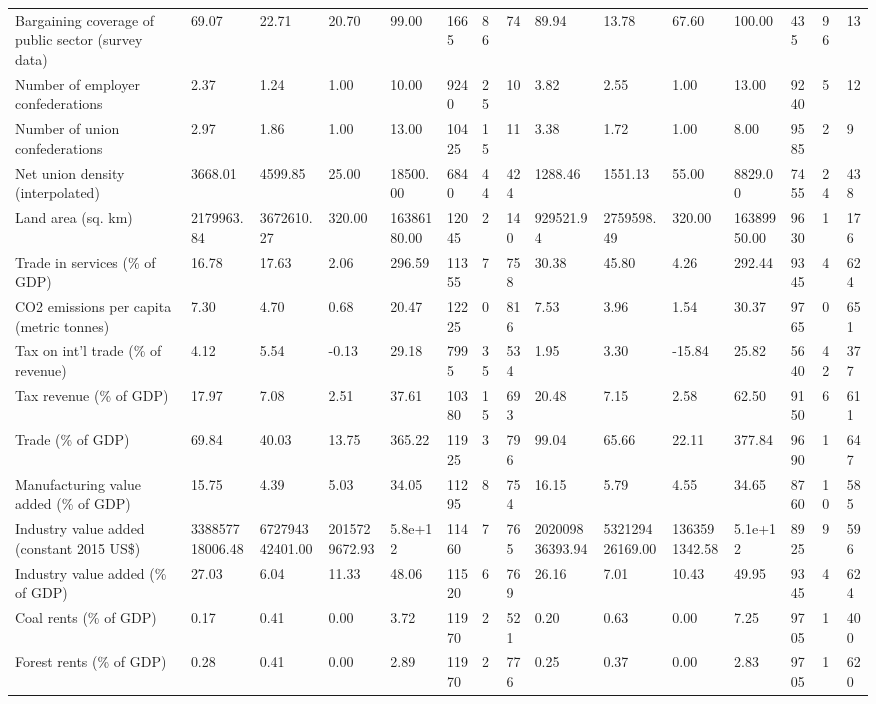 \begin{longtable}{lllllllllllllll}
\addlinespace
Bargaining coverage of public sector (survey data) & 69.07 & 22.71 & 20.70 & 99.00 & 1665 & 86 & 74 & 89.94 & 13.78 & 67.60 & 100.00 & 435 & 96 & 13\\
Number of employer confederations & 2.37 & 1.24 & 1.00 & 10.00 & 9240 & 25 & 10 & 3.82 & 2.55 & 1.00 & 13.00 & 9240 & 5 & 12\\
Number of union confederations & 2.97 & 1.86 & 1.00 & 13.00 & 10425 & 15 & 11 & 3.38 & 1.72 & 1.00 & 8.00 & 9585 & 2 & 9\\
Net union density (interpolated) & 3668.01 & 4599.85 & 25.00 & 18500.00 & 6840 & 44 & 424 & 1288.46 & 1551.13 & 55.00 & 8829.00 & 7455 & 24 & 438\\
Land area (sq. km) & 2179963.84 & 3672610.27 & 320.00 & 16386180.00 & 12045 & 2 & 140 & 929521.94 & 2759598.49 & 320.00 & 16389950.00 & 9630 & 1 & 176\\
\addlinespace
Trade in services (\% of GDP) & 16.78 & 17.63 & 2.06 & 296.59 & 11355 & 7 & 758 & 30.38 & 45.80 & 4.26 & 292.44 & 9345 & 4 & 624\\
CO2 emissions per capita (metric tonnes) & 7.30 & 4.70 & 0.68 & 20.47 & 12225 & 0 & 816 & 7.53 & 3.96 & 1.54 & 30.37 & 9765 & 0 & 651\\
Tax on int'l trade (\% of revenue) & 4.12 & 5.54 & -0.13 & 29.18 & 7995 & 35 & 534 & 1.95 & 3.30 & -15.84 & 25.82 & 5640 & 42 & 377\\
Tax revenue (\% of GDP) & 17.97 & 7.08 & 2.51 & 37.61 & 10380 & 15 & 693 & 20.48 & 7.15 & 2.58 & 62.50 & 9150 & 6 & 611\\
Trade (\% of GDP) & 69.84 & 40.03 & 13.75 & 365.22 & 11925 & 3 & 796 & 99.04 & 65.66 & 22.11 & 377.84 & 9690 & 1 & 647\\
\addlinespace
Manufacturing value added (\% of GDP) & 15.75 & 4.39 & 5.03 & 34.05 & 11295 & 8 & 754 & 16.15 & 5.79 & 4.55 & 34.65 & 8760 & 10 & 585\\
Industry value added (constant 2015 US\$) & 338857718006.48 & 672794342401.00 & 2015729672.93 & 5.8e+12 & 11460 & 7 & 765 & 202009836393.94 & 532129426169.00 & 1363591342.58 & 5.1e+12 & 8925 & 9 & 596\\
Industry value added (\% of GDP) & 27.03 & 6.04 & 11.33 & 48.06 & 11520 & 6 & 769 & 26.16 & 7.01 & 10.43 & 49.95 & 9345 & 4 & 624\\
Coal rents (\% of GDP) & 0.17 & 0.41 & 0.00 & 3.72 & 11970 & 2 & 521 & 0.20 & 0.63 & 0.00 & 7.25 & 9705 & 1 & 400\\
Forest rents (\% of GDP) & 0.28 & 0.41 & 0.00 & 2.89 & 11970 & 2 & 776 & 0.25 & 0.37 & 0.00 & 2.83 & 9705 & 1 & 620\\

\end{longtable}
